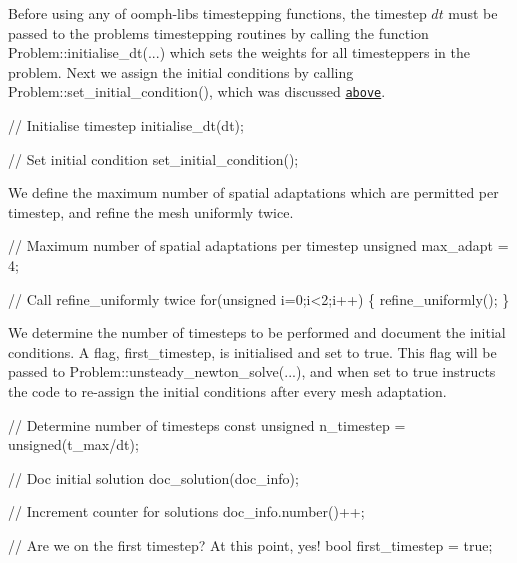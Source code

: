 Before using any of {\ttfamily oomph-\/lib\textquotesingle{}s} timestepping functions, the timestep $ dt $ must be passed to the problem\textquotesingle{}s timestepping routines by calling the function {\ttfamily Problem\+::initialise\+\_\+dt}(...) which sets the weights for all timesteppers in the problem. Next we assign the initial conditions by calling {\ttfamily Problem\+::set\+\_\+initial\+\_\+condition()}, which was discussed \href{#set_initial_condition}{\tt above}.


\begin{DoxyCodeInclude}
 \textcolor{comment}{// Initialise timestep}
 initialise\_dt(dt);

 \textcolor{comment}{// Set initial condition}
 set\_initial\_condition();

\end{DoxyCodeInclude}


We define the maximum number of spatial adaptations which are permitted per timestep, and refine the mesh uniformly twice.


\begin{DoxyCodeInclude}
 \textcolor{comment}{// Maximum number of spatial adaptations per timestep}
 \textcolor{keywordtype}{unsigned} max\_adapt = 4;

 \textcolor{comment}{// Call refine\_uniformly twice}
 \textcolor{keywordflow}{for}(\textcolor{keywordtype}{unsigned} i=0;i<2;i++) \{ refine\_uniformly(); \}

\end{DoxyCodeInclude}


We determine the number of timesteps to be performed and document the initial conditions. A flag, {\ttfamily first\+\_\+timestep}, is initialised and set to true. This flag will be passed to {\ttfamily Problem\+::unsteady\+\_\+newton\+\_\+solve}(...), and when set to true instructs the code to re-\/assign the initial conditions after every mesh adaptation.


\begin{DoxyCodeInclude}
 \textcolor{comment}{// Determine number of timesteps}
 \textcolor{keyword}{const} \textcolor{keywordtype}{unsigned} n\_timestep = unsigned(t\_max/dt);

 \textcolor{comment}{// Doc initial solution}
 doc\_solution(doc\_info);

 \textcolor{comment}{// Increment counter for solutions }
 doc\_info.number()++;

 \textcolor{comment}{// Are we on the first timestep? At this point, yes!}
 \textcolor{keywordtype}{bool} first\_timestep = \textcolor{keyword}{true};

\end{DoxyCodeInclude}


